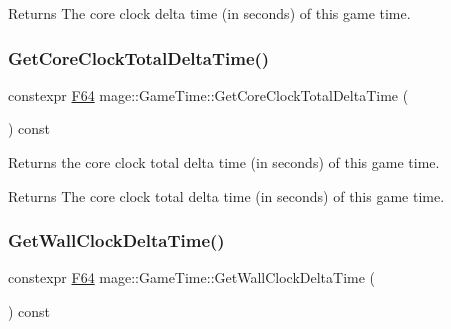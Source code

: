 \begin{DoxyReturn}{Returns}
The core clock delta time (in seconds) of this game time. 
\end{DoxyReturn}
\mbox{\label{classmage_1_1_game_time_a3331e36e04befebb4cebac79d12deb16}} 
\subsubsection{\texorpdfstring{Get\+Core\+Clock\+Total\+Delta\+Time()}{GetCoreClockTotalDeltaTime()}}
{\footnotesize\ttfamily constexpr \mbox{\hyperlink{namespacemage_ad26233bbec640deda836e572c1a23708}{F64}} mage\+::\+Game\+Time\+::\+Get\+Core\+Clock\+Total\+Delta\+Time (\begin{DoxyParamCaption}{ }\end{DoxyParamCaption}) const\hspace{0.3cm}{\ttfamily [noexcept]}}

Returns the core clock total delta time (in seconds) of this game time.

\begin{DoxyReturn}{Returns}
The core clock total delta time (in seconds) of this game time. 
\end{DoxyReturn}
\mbox{\label{classmage_1_1_game_time_a2ff13142221349d3368645bcbe0cfb8d}} 
\subsubsection{\texorpdfstring{Get\+Wall\+Clock\+Delta\+Time()}{GetWallClockDeltaTime()}}
{\footnotesize\ttfamily constexpr \mbox{\hyperlink{namespacemage_ad26233bbec640deda836e572c1a23708}{F64}} mage\+::\+Game\+Time\+::\+Get\+Wall\+Clock\+Delta\+Time (\begin{DoxyParamCaption}{ }\end{DoxyParamCaption}) const\hspace{0.3cm}{\ttfamily [noexcept]}}

